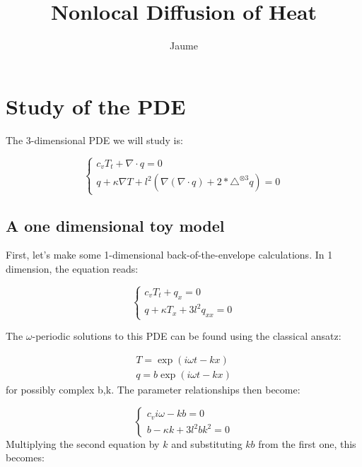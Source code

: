 \documentclass[a4paper, 11pt]{article}
\title{Nonlocal Diffusion of Heat}
\author{Jaume}
\begin{document}
\section{Study of the PDE} %
\label{sec:study_of_the_pde}

The 3-dimensional PDE we will study is:

\begin{equation}
	\label{eq:hydrodinamic_pde}
	\begin{cases}
		{c_v T_t + \nabla \cdot q =0} \\
		{q +\kappa \nabla T + l^2(\nabla(\nabla \cdot q) + 2*\triangle^{\otimes 3} q) = 0}
	\end{cases}
\end{equation}

\subsection{A one dimensional toy model} %
\label{sub:a_one_dimensional_toy_model}


First, let's make some 1-dimensional back-of-the-envelope calculations. In 1 dimension, the equation reads:

\begin{equation}
	\begin{cases}
		{c_v T_t + q_x =0} \\
		{q +\kappa T_x+ 3 l^2 q_{xx} = 0}
	\end{cases}
\end{equation}

The $\omega$-periodic solutions to this PDE can be found using the classical ansatz:

\begin{equation}
	\begin{aligned}
		T = \exp(i \omega t - k x) \\
		q = b \exp(i \omega t - k x)
	\end{aligned}
\end{equation}
for possibly complex b,k. The parameter relationships then become:

\begin{equation}
	\label{eq:ansatz_coeff_matching}
	\begin{cases}
		{c_v i \omega - k b =0} \\
		{b -\kappa k+ 3 l^2 bk^2 = 0}
	\end{cases}
\end{equation}
Multiplying the second equation by $k$ and substituting $kb$ from the first one, this becomes:
\end{document}
